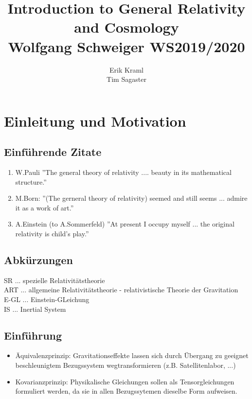 \documentclass[a4paper, 11pt]{article}
\numberwithin{equation}{section}
\begin{document}
\title{Introduction to General Relativity and Cosmology\\\small{Wolfgang Schweiger WS2019/2020}}
\author{Erik Kraml \\ Tim Sagaster}
\maketitle
\newpage
\tableofcontents
\newpage


\setcounter{section}{-1}
\section{Einleitung und Motivation}
\subsection*{Einführende Zitate}
\begin{enumerate}
\item W.Pauli ''The general theory of relativity ....  beauty in its mathematical structure.''
\item M.Born: ''(The gerneral theory of relativity) seemed and still seems ... admire it as a work of art.''
\item A.Einstein (to A.Sommerfeld) ''At present I occupy myself ... the original relativity is child's play.''

\end{enumerate}

\subsection*{Abkürzungen}
SR ... spezielle Relativitätstheorie \\
ART ... allgemeine Relativitätstheorie - relativistische Theorie der Gravitation\\
E-GL ... Einstein-GLeichung\\
IS ... Inertial System

\subsection*{Einführung}
\begin{itemize}
\item Äquivalenzprinzip: Gravitationseffekte lassen sich durch Übergang zu geeignet beschleunigtem Bezugssystem wegtransformieren (z.B. Satellitenlabor, ...)

\item Kovarianzprinzip: Physikalische Gleichungen sollen als Tensorgleichungen formuliert werden, da sie in allen Bezugssytemen dieselbe Form aufweisen.
\end{itemize}
\end{document}
